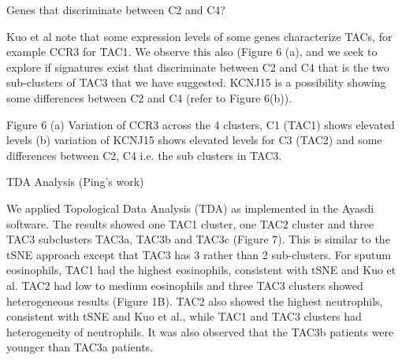 \documentclass[9pt,twocolumn,twoside]{pnas-new}
\begin{document}
Genes that discriminate between C2 and C4?

Kuo et al note that some expression levels of some genes characterize TACs, for example CCR3 for TAC1. We observe this also (Figure 6 (a), and we seek to explore if signatures exist that discriminate between C2 and C4 that is the two sub-clusters of TAC3 that we have suggested. KCNJ15 is a possibility showing some differences between C2 and C4 (refer to Figure 6(b)).

Figure 6 (a) Variation of CCR3 across the 4 clusters, C1 (TAC1) shows elevated levels (b) variation of KCNJ15 shows elevated levels for C3 (TAC2) and some differences between C2, C4 i.e. the sub clusters in TAC3.

TDA Analysis (Ping’s work)

We applied Topological Data Analysis (TDA) as implemented in the Ayasdi software. The results showed one TAC1 cluster, one TAC2 cluster and three TAC3 subclusters TAC3a, TAC3b and TAC3c (Figure 7). 
This is similar to the tSNE approach except that TAC3 has 3 rather than 2 sub-clusters. 
For sputum eosinophils, TAC1 had the highest eosinophils, consistent with tSNE and Kuo et al. TAC2 had low to medium eosinophils and three TAC3 clusters showed heterogeneous results (Figure 1B). TAC2 also showed the highest neutrophils, consistent with tSNE and Kuo et al., while TAC1 and TAC3 clusters had heterogeneity of neutrophils. It was also observed that the TAC3b patients were younger than TAC3a patients.



\end{document}
